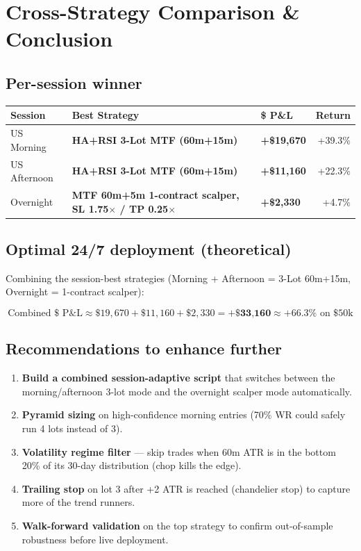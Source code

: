 \documentclass[11pt]{article}
\newcommand{\pos}[1]{\textcolor{posgreen}{\textbf{#1}}}
\begin{document}
\newpage
\section{Cross-Strategy Comparison \& Conclusion}

\subsection{Per-session winner}
\begin{table}[h!]
\centering
\small
\begin{tabular}{lllr}
\toprule
Session & Best Strategy & \$ P\&L & Return \\
\midrule
US Morning   & \pos{HA+RSI 3-Lot MTF (60m+15m)} & \pos{+\$19{,}670} & +39.3\% \\
US Afternoon & \pos{HA+RSI 3-Lot MTF (60m+15m)} & \pos{+\$11{,}160} & +22.3\% \\
Overnight    & \pos{MTF 60m+5m 1-contract scalper, SL 1.75$\times$ / TP 0.25$\times$} & \pos{+\$2{,}330} & +4.7\% \\
\bottomrule
\end{tabular}
\end{table}

\subsection{Optimal 24/7 deployment (theoretical)}
Combining the session-best strategies (Morning + Afternoon = 3-Lot 60m+15m, Overnight = 1-contract scalper):

\[
\text{Combined } \$\text{ P\&L} \approx \$19{,}670 + \$11{,}160 + \$2{,}330 = \boxed{\textbf{+\$33{,}160}} \approx +66.3\% \text{ on \$50k}
\]

\subsection{Recommendations to enhance further}
\begin{enumerate}
\item \textbf{Build a combined session-adaptive script} that switches between the morning/afternoon 3-lot mode and the overnight scalper mode automatically.
\item \textbf{Pyramid sizing} on high-confidence morning entries (70\% WR could safely run 4 lots instead of 3).
\item \textbf{Volatility regime filter} --- skip trades when 60m ATR is in the bottom 20\% of its 30-day distribution (chop kills the edge).
\item \textbf{Trailing stop} on lot 3 after +2 ATR is reached (chandelier stop) to capture more of the trend runners.
\item \textbf{Walk-forward validation} on the top strategy to confirm out-of-sample robustness before live deployment.
\end{enumerate}
\end{document}
